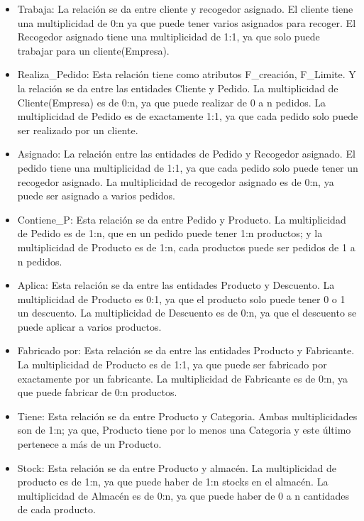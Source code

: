 \documentclass[10pt, a4paper,openany]{report}
\begin{document}
\begin{itemize}
  \item Trabaja: La relación se da entre cliente y recogedor asignado. El cliente tiene una multiplicidad de 0:n ya que puede tener varios asignados para recoger. El Recogedor asignado tiene una multiplicidad de 1:1, ya que solo puede trabajar para un cliente(Empresa).

\item Realiza\_Pedido: Esta relación tiene como atributos F\_creación, F\_Limite. Y la relación se da entre las entidades Cliente y Pedido. La multiplicidad de Cliente(Empresa) es de 0:n, ya que puede realizar  de 0 a n pedidos. La multiplicidad de Pedido es de exactamente 1:1, ya que cada pedido solo puede ser realizado por un cliente.

\item Asignado: La relación entre las entidades de Pedido y Recogedor asignado. El pedido tiene una multiplicidad de 1:1, ya que cada pedido solo puede tener un recogedor asignado. La multiplicidad de recogedor asignado es de 0:n, ya puede ser asignado a varios pedidos.
 
\item Contiene\_P: Esta relación se da entre Pedido y Producto. La multiplicidad de Pedido es de 1:n, que en un pedido puede tener 1:n productos; y la multiplicidad de Producto es de 1:n, cada productos puede ser pedidos de 1 a n pedidos.
\item Aplica: Esta relación se da entre las entidades Producto y Descuento. La multiplicidad de  Producto es 0:1, ya que el producto solo puede tener 0 o 1 un descuento. La multiplicidad de Descuento es de 0:n, ya que el descuento se puede aplicar a varios productos.
\item Fabricado por: Esta relación se da entre las entidades Producto y Fabricante. La multiplicidad de Producto es de 1:1, ya que puede ser fabricado por exactamente por un fabricante. La multiplicidad de Fabricante es de 0:n, ya que puede fabricar de 0:n productos. 
\item Tiene: Esta relación se da entre Producto y Categoria. Ambas multiplicidades son de 1:n; ya que, Producto tiene por lo menos una Categoria y este último pertenece a más de un Producto.
\item Stock: Esta relación se da entre Producto y almacén. La multiplicidad de  producto es de 1:n, ya que puede haber de 1:n stocks en el almacén. La multiplicidad de Almacén es de  0:n, ya que puede haber de 0 a n cantidades de cada producto.


\end{itemize}
\end{document}
